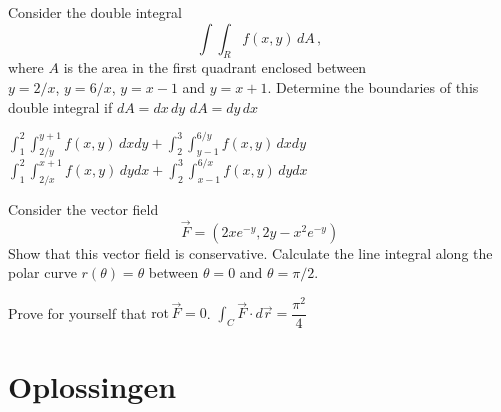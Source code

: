 \begin{Exercise} Consider the double integral
$$
\int\int_Rf(x,y)\,dA\,,
$$
where $A$ is the area in the first quadrant enclosed between\\ $y=2/x$, $y=6/x$, $y=x-1$ and $y=x+1$. Determine the boundaries of this double integral if
\Question $dA=dx\,dy$
\Question $dA=dy\,dx$
\end{Exercise}

\begin{Answer}

\Question $\displaystyle\int_1^2\int_{2/y}^{y+1} f(x,y)\, dxdy + \int_2^3\int_{y-1}^{6/y} f(x,y)\, dxdy$
\Question $\displaystyle\int_1^2\int_{2/x}^{x+1} f(x,y)\, dydx + \int_2^3\int_{x-1}^{6/x} f(x,y)\, dydx$
    
\end{Answer}



\begin{Exercise} Consider the vector field
$$
\vec{F}=\left(2xe^{-y},2y-x^2e^{-y}\right)
$$
\Question Show that this vector field is conservative. 
\Question Calculate the line integral along the polar curve $r(\theta)=\theta$ between $\theta=0$ and $\theta=\pi/2$. 
\end{Exercise}

\begin{Answer}

\Question Prove for yourself that $\text{rot}\,\vec{F} = 0$.
\Question $\displaystyle\int_C \vec{F}\cdot d\vec{r} = \dfrac{\pi^2}{4}$
    
\end{Answer}



\fi

\section{Oplossingen}